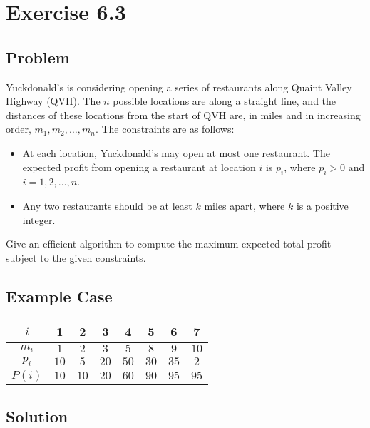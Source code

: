 \documentclass[12pt, letterpaper]{article}
\begin{document}
\section{Exercise 6.3}

\subsection{Problem}

Yuckdonald's is considering opening a series of restaurants along Quaint Valley Highway (QVH). The \(n\) possible locations are along a straight line, and the distances of these locations from the start of QVH are, in miles and in increasing order, \(m_1, m_2, \dots, m_n\). The constraints are as follows:

\begin{itemize}
    \item At each location, Yuckdonald's may open at most one restaurant. The expected profit from opening a restaurant at location \(i\) is \(p_i\), where \(p_i > 0\) and \(i = 1,2,\dots,n\).
    \item Any two restaurants should be at least \(k\) miles apart, where \(k\) is a positive integer.
\end{itemize}
    
Give an efficient algorithm to compute the maximum expected total profit subject to the given constraints.

\subsection{Example Case}

\begin{center}
\begin{tabular}{|c|c|c|c|c|c|c|c|}
    \hline
    \(i\) & 1 & 2 & 3 & 4 & 5 & 6 & 7 \\
    \hline
    \hline
    \(m_i\) & \(1\) & \(2\) & \(3\) & \(5\) & \(8\) & \(9\) & \(10\) \\
    \hline
    \(p_i\) & \(10\) & \(5\) & \(20\) & \(50\) & \(30\) & \(35\) & \(2\) \\
    \hline
    \(P(i)\) & \boldmath\(10\) & \(10\) & \(20\) & \boldmath\(60\) & \(90\) & \boldmath\(95\) & \(95\) \\
    \hline
\end{tabular}
\end{center}

\subsection{Solution}
\end{document}
